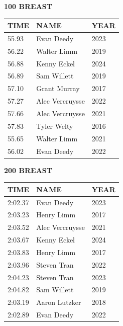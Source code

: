 \begin{table}[H]
\centering
\begin{minipage}[t]{0.48\textwidth}
\centering
\textbf{100 BREAST}\\[0.1cm]
\begin{tabular}{@{}p{1.8cm}p{2.8cm}p{1.2cm}@{}}
\hline
    \textbf{TIME} & \textbf{NAME} & \textbf{YEAR} \\
\hline
    55.93 & Evan Deedy & 2023 \\
    56.22 & Walter Limm & 2019 \\
    56.88 & Kenny Eckel & 2024 \\
    56.89 & Sam Willett & 2019 \\
    57.10 & Grant Murray & 2017 \\
    57.27 & Alec Vercruysse & 2022 \\
    57.66 & Alec Vercruysse & 2021 \\
    57.83 & Tyler Welty & 2016 \\
    55.65 & Walter Limm & 2021 \\
    56.02 & Evan Deedy & 2022 \\
\hline
\end{tabular}
\end{minipage}\hfill
\begin{minipage}[t]{0.48\textwidth}
\centering
\textbf{200 BREAST}\\[0.1cm]
\begin{tabular}{@{}p{1.8cm}p{2.8cm}p{1.2cm}@{}}
\hline
    \textbf{TIME} & \textbf{NAME} & \textbf{YEAR} \\
\hline
    2:02.37 & Evan Deedy & 2023 \\
    2:03.23 & Henry Limm & 2017 \\
    2:03.52 & Alec Vercruysse & 2021 \\
    2:03.67 & Kenny Eckel & 2024 \\
    2:03.83 & Henry Limm & 2017 \\
    2:03.96 & Steven Tran & 2022 \\
    2:04.23 & Steven Tran & 2023 \\
    2:04.82 & Sam Willett & 2019 \\
    2:03.19 & Aaron Lutzker & 2018 \\
    2:02.89 & Evan Deedy & 2022 \\
\hline
\end{tabular}
\end{minipage}
\end{table}

